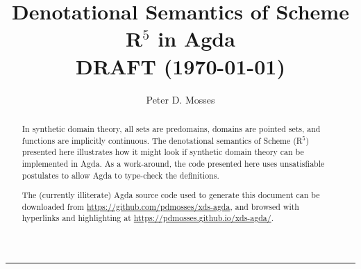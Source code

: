 \documentclass[a4paper]{easychair}
\title{Denotational Semantics of Scheme R${}^5$ in Agda \\[2ex]
\normalsize DRAFT (\today)}
\author{
Peter D. Mosses%
}
\institute{
  Delft University of Technology, The Netherlands
  \\
  \email{p.d.mosses@tudelft.nl}
\\
   Swansea University, United Kingdom
 }
\begin{document}
\maketitle

\begin{abstract}
In synthetic domain theory, all sets are predomains, domains are pointed sets, and functions are implicitly continuous.
The denotational semantics of Scheme (R${}^5$) presented here illustrates how it might look if synthetic domain theory can be implemented in Agda.
As a work-around, the code presented here uses unsatisfiable postulates to allow Agda to type-check the definitions.

The (currently illiterate) Agda source code used to generate this document can be downloaded from
\url{https://github.com/pdmosses/xds-agda}, and browsed with hyperlinks and highlighting at
\url{https://pdmosses.github.io/xds-agda/}.
\end{abstract}


\bigskip\hrule\bigskip



\clearpage



\clearpage



\clearpage



\clearpage



\clearpage




%
\end{document}

